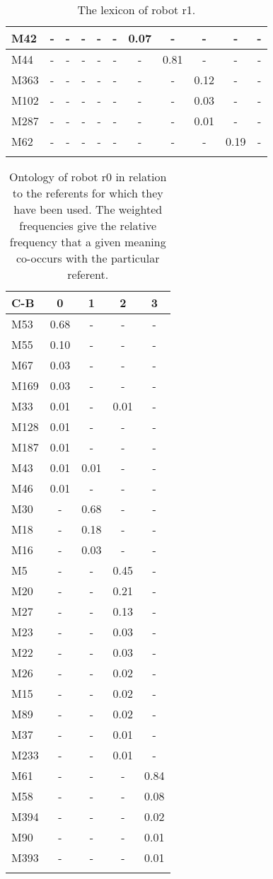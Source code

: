 \begin{table}[h]
{\begin{tabular}{lcccccccccc}
M42 & - & - & - & - & - & 0.07 & - & - & - & -\\\hline
M44 & - & - & - & - & - & - & 0.81 & - & - & -\\\hline
M363 & - & - & - & - & - & - & - & 0.12 & - & -\\\hline
M102 & - & - & - & - & - & - & - & 0.03 & - & -\\\hline
M287 & - & - & - & - & - & - & - & 0.01 & - & -\\\hline
M62 & - & - & - & - & - & - & - & - & 0.19 & -\\
\lspbottomrule
\end{tabular}}
\caption{The lexicon of robot r1.}
\label{t:st:lexicon1}
\end{table}

\begin{table}[h]
\centering
{\footnotesize\begin{tabular}{lcccc}
\lsptoprule
C-B & 0 & 1 & 2 & 3\\\midrule
M53 & 0.68 & - & - & -\\\hline
M55 & 0.10 & - & - & -\\\hline
M67 & 0.03 & - & - & -\\\hline
M169 & 0.03 & - & - & -\\\hline
M33 & 0.01 & - & 0.01 & -\\\hline
M128 & 0.01 & - & - & -\\\hline
M187 & 0.01 & - & - & -\\\hline
M43 & 0.01 & 0.01 & - & -\\\hline
M46 & 0.01 & - & - & -\\\hline
M30 & - & 0.68 & - & -\\\hline
M18 & - & 0.18 & - & -\\\hline
M16 & - & 0.03 & - & -\\\hline
M5 & - & - & 0.45 & -\\\hline
M20 & - & - & 0.21 & -\\\hline
M27 & - & - & 0.13 & -\\\hline
M23 & - & - & 0.03 & -\\\hline
M22 & - & - & 0.03 & -\\\hline
M26 & - & - & 0.02 & -\\\hline
M15 & - & - & 0.02 & -\\\hline
M89 & - & - & 0.02 & -\\\hline
M37 & - & - & 0.01 & -\\\hline
M233 & - & - & 0.01 & -\\\hline
M61 & - & - & - & 0.84\\\hline
M58 & - & - & - & 0.08\\\hline
M394 & - & - & - & 0.02\\\hline
M90 & - & - & - & 0.01\\\hline
M393 & - & - & - & 0.01\\
\lspbottomrule
\end{tabular}}
\caption{Ontology of robot r0 in relation to the referents for which they have been used. The weighted frequencies give the relative frequency that a given meaning co-occurs with the particular referent.}
\label{t:st:ontology0}
\end{table}

